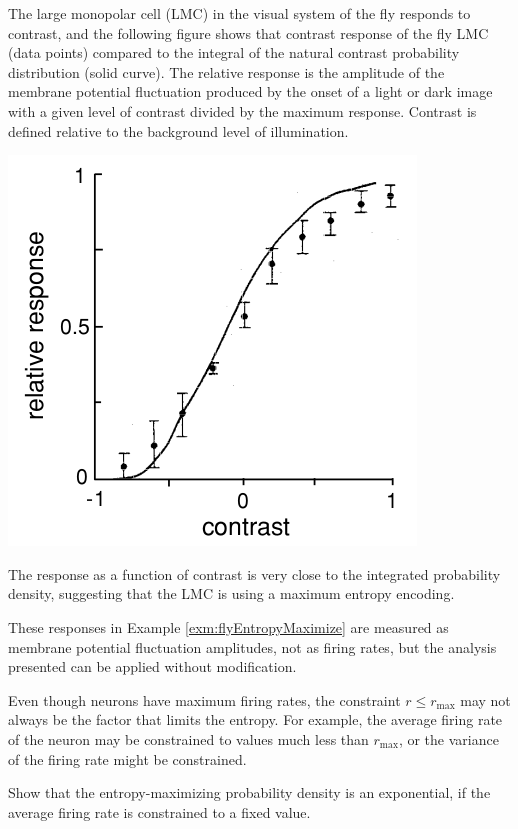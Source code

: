 \begin{exm}
  \label{exm:flyEntropyMaximize}
  The large monopolar cell (LMC) in the visual system of the fly responds to contrast, and the following figure shows that contrast response of the fly LMC (data points) compared to the integral of the natural contrast probability distribution (solid curve). The relative response is the amplitude of the membrane potential fluctuation produced by the onset of a light or dark image with a given level of contrast divided by the maximum response. Contrast is defined relative to the background level of illumination.
\begin{center}
    \label{fig:4-2}
  \includegraphics[scale = 0.35]{./png/4-2}
\end{center}
The response as a function of contrast is very close to the integrated probability density, suggesting that the LMC is using a maximum entropy encoding.
\end{exm}

\begin{rem}
  These responses in Example \ref{exm:flyEntropyMaximize} are measured as membrane potential fluctuation amplitudes, not as firing rates, but the analysis presented can be applied without modification.
\end{rem}


\begin{rem}
  Even though neurons have maximum firing rates, the constraint $r\leq r_{{\max}}$
  may not always be the factor that limits the entropy. For example,
  the average firing rate of the neuron may be constrained to values
  much less than $r_{{\max}}$, or the variance of the firing rate might be constrained.
\end{rem}
\begin{exc}
  Show that the entropy-maximizing probability density is an exponential, if the average firing rate is constrained to a fixed value.
\end{exc}

